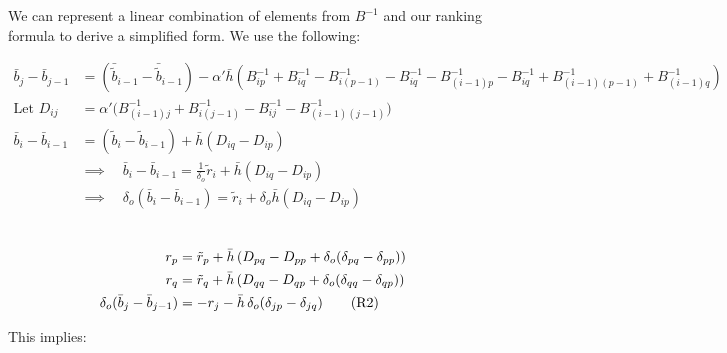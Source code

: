 \documentclass{article}
\theoremstyle{plain}
\begin{document}
We can represent a linear combination of elements from $B^{-1}$ and our ranking formula to derive a simplified form.  We use the following:

\begin{align}
\bar{b}_j - \bar{b}_{j-1} 
  &= \left( \bar{\tilde{b}}_{i-1} - \bar{\tilde{b}}_{i-1} \right) 
  - \alpha' \bar{h} \left( B^{-1}_{ip} + B^{-1}_{iq} - B^{-1}_{i(p-1)} - B^{-1}_{iq} - B^{-1}_{(i-1)p} - B^{-1}_{iq} + B^{-1}_{(i-1)(p-1)} + B^{-1}_{(i-1)q} \right) \\
  \text{Let } D_{ij} &= \alpha' \Big( B^{-1}_{(i-1)j} + B^{-1}_{i(j-1)} - B^{-1}_{ij} - B^{-1}_{(i-1)(j-1)} \Big) \\
  \bar{b}_i - \bar{b}_{i-1} &= \left( \tilde{b}_i - \tilde{b}_{i-1} \right) 
     + \bar{h} \left( D_{iq} - D_{ip} \right) \\
     & \implies \quad \bar{b}_i - \bar{b}_{i-1} 
  = \tfrac{1}{\delta_o}\tilde{r}_i + \bar{h} \left( D_{iq} - D_{ip} \right) \\
  & \implies \quad \delta_o (\bar{b}_i - \bar{b}_{i-1}) 
  = \tilde{r}_i + \delta_o \bar{h} \left( D_{iq} - D_{ip} \right)
\tag{R1}
\end{align}

\begin{align}
     \\r_p &= \tilde{r}_p + \bar{h} \left( D_{pq} - D_{pp} + \delta_o (\delta_{pq} - \delta_{pp}) \right) \notag \\
     r_q &= \tilde{r}_q + \bar{h} \left( D_{qq} - D_{qp} + \delta_o (\delta_{qq} - \delta_{qp}) \right)\notag \\
    \delta_o (\bar{b}_j - \bar{b}_{j-1}) &= -r_j - \bar{h} \, \delta_o (\delta_{jp} - \delta_{jq}) \tag{R2}
\end{align}

This implies:
\end{document}
